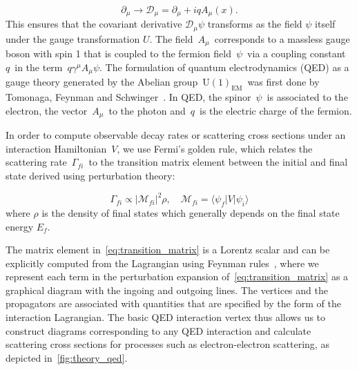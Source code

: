 \begin{equation}
\partial_{\mu} \rightarrow \mathcal{D}_{\mu} = \partial_{\mu} + i q A_{\mu}(x).
\end{equation}
This ensures that the covariant derivative $\mathcal{D}_{\mu}\psi$ transforms as the field $\psi$ itself under the gauge transformation $U$.
The field~$A_{\mu}$~corresponds to a massless gauge boson with spin 1 that is coupled to the fermion field~$\psi$~via a coupling constant~$q$~in the term~$q \gamma^\mu A_\mu \psi$. The formulation of quantum electrodynamics (QED) as a gauge theory generated by the Abelian group~$\mathrm{U}(1)_{\mathrm{EM}}$~was first done by Tomonaga, Feynman and Schwinger~\cite{PhysRev.73.416, PhysRev.74.1439, PhysRev.76.769}. In QED, the spinor~$\psi$~is associated to the electron, the vector~$A_\mu$~to the photon and~$q$~is the electric charge of the fermion. 

In order to compute observable decay rates or scattering cross sections under an interaction Hamiltonian~$V$, we use Fermi's golden rule, which relates the scattering rate~$\Gamma_{fi}$~to the transition matrix element between the initial and final state derived using perturbation theory:

\begin{equation}
\label{eq:transition_matrix}
\Gamma_{fi} \propto |\mathcal{M}_{fi}|^2 \rho,\quad \mathcal{M}_{fi} = \langle \psi_f | V | \psi_i \rangle
\end{equation}
where $\rho$ is the density of final states which generally depends on the final state energy $E_f$.

The matrix element in~\cref{eq:transition_matrix} is a Lorentz scalar and can be explicitly computed from the Lagrangian using Feynman rules~\cite{Feynman:1948ur}, where we represent each term in the perturbation expansion of~\cref{eq:transition_matrix} as a graphical diagram with the ingoing and outgoing lines. The vertices and the propagators are associated with quantities that are specified by the form of the interaction Lagrangian. The basic QED interaction vertex thus allows us to construct diagrams corresponding to any QED interaction and calculate scattering cross sections for processes such as electron-electron scattering, as depicted in~\cref{fig:theory_qed}.

